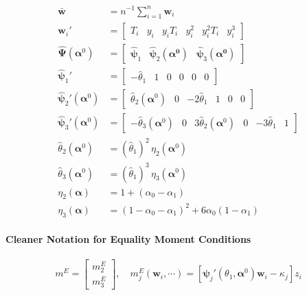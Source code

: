 \documentclass[12pt]{article}
\begin{document}
\begin{align*}
  \bar{\mathbf{w}} &= n^{-1} \sum_{i=1}^n \mathbf{w}_i \\
  \mathbf{w}_i' &= \left[
  \begin{array}{cccccc}
    T_i & y_i & y_i T_i & y_i^2 & y^2_i T_i & y_i^3
  \end{array}
\right]\\
\widehat{\boldsymbol{\Psi}}(\boldsymbol{\alpha}^0) &= \left[
\begin{array}{lll}
  \widehat{\boldsymbol{\psi}}_1 &
  \widehat{\boldsymbol{\psi}}_2(\boldsymbol{\alpha^0}) &
  \widehat{\boldsymbol{\psi}}_3(\boldsymbol{\alpha^0})
\end{array}
\right]\\
\widehat{\boldsymbol{\psi}}_1' &= \left[
  \begin{array}{cccccc}
    -\widehat{\theta}_1 & 1 & 0 & 0 & 0 & 0 
  \end{array}
\right] \\
  \widehat{\boldsymbol{\psi}}_2'(\boldsymbol{\alpha}^0) &= \left[
  \begin{array}{cccccc}
    \widehat{\theta}_2(\boldsymbol{\alpha}^0) & 0 & -2\widehat{\theta}_1 & 1 & 0 & 0
  \end{array}
\right] \\
\widehat{\boldsymbol{\psi}}_3'(\boldsymbol{\alpha}^0) &= \left[
  \begin{array}{cccccc}
    -\widehat{\theta}_3(\boldsymbol{\alpha}^0) & 0 & 3\widehat{\theta}_2(\boldsymbol{\alpha}^0) & 0 & -3\widehat{\theta}_1 & 1
  \end{array}
\right] \\
  \widehat{\theta}_2(\boldsymbol{\alpha}^0) &= (\widehat{\theta}_1)^2 \, \eta_2(\boldsymbol{\alpha}^0)\\
  \widehat{\theta}_3(\boldsymbol{\alpha}^0) &= (\widehat{\theta}_1)^3\, \eta_3(\boldsymbol{\alpha}^0)\\
  \eta_2(\boldsymbol{\alpha}) &= 1 + (\alpha_0 - \alpha_1)\\
  \eta_3(\boldsymbol{\alpha}) &= (1 - \alpha_0 - \alpha_1)^2 + 6\alpha_0(1 - \alpha_1)
\end{align*}

\paragraph{Cleaner Notation for Equality Moment Conditions} 
\[
m^E = \left[
  \begin{array}{cc}
    m_2^E \\ m_3^E 
  \end{array}
\right], \quad m_j^E(\mathbf{w}_i, \cdots) = \left[ \boldsymbol{\psi}_j'(\theta_1, \boldsymbol{\alpha}^0) \mathbf{w}_i - \kappa_j \right]z_i 
\]
\end{document}
